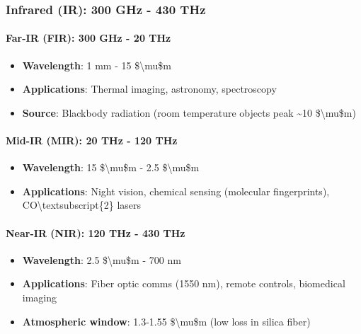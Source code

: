 \subsubsection{Infrared (IR): 300 GHz - 430
THz}\label{infrared-ir-300-ghz---430-thz}

\paragraph{\texorpdfstring{\textbf{Far-IR (FIR): 300 GHz - 20
THz}}{Far-IR (FIR): 300 GHz - 20 THz}}\label{far-ir-fir-300-ghz---20-thz}

\begin{itemize}
\tightlist
\item
  \textbf{Wavelength}: 1 mm - 15 \$\textbackslash mu\$m
\item
  \textbf{Applications}: Thermal imaging, astronomy, spectroscopy
\item
  \textbf{Source}: Blackbody radiation (room temperature objects peak
  \textasciitilde10 \$\textbackslash mu\$m)
\end{itemize}

\paragraph{\texorpdfstring{\textbf{Mid-IR (MIR): 20 THz - 120
THz}}{Mid-IR (MIR): 20 THz - 120 THz}}\label{mid-ir-mir-20-thz---120-thz}

\begin{itemize}
\tightlist
\item
  \textbf{Wavelength}: 15 \$\textbackslash mu\$m - 2.5
  \$\textbackslash mu\$m
\item
  \textbf{Applications}: Night vision, chemical sensing (molecular
  fingerprints), CO\textbackslash textsubscript\{2\} lasers
\end{itemize}

\paragraph{\texorpdfstring{\textbf{Near-IR (NIR): 120 THz - 430
THz}}{Near-IR (NIR): 120 THz - 430 THz}}\label{near-ir-nir-120-thz---430-thz}

\begin{itemize}
\tightlist
\item
  \textbf{Wavelength}: 2.5 \$\textbackslash mu\$m - 700 nm
\item
  \textbf{Applications}: Fiber optic comms (1550 nm), remote controls,
  biomedical imaging
\item
  \textbf{Atmospheric window}: 1.3-1.55 \$\textbackslash mu\$m (low loss
  in silica fiber)
\end{itemize}

